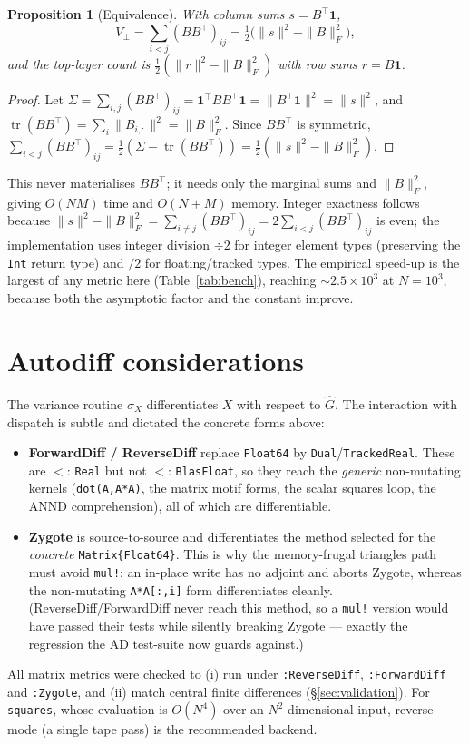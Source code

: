 \documentclass[11pt]{article}
\theoremstyle{plain}
\newtheorem{proposition}{Proposition}
\theoremstyle{definition}
\newcommand{\tr}{\operatorname{tr}}
\newcommand{\Ghat}{\hat{G}}
\begin{document}
\begin{proposition}[Equivalence]\label{prop:vmot}
With column sums $s=B^\top\mathbf 1$,
\[
V_\perp=\sum_{i<j}(BB^\top)_{ij}=\tfrac12\big(\|s\|^2-\|B\|_F^2\big),
\]
and the top-layer count is $\tfrac12(\|r\|^2-\|B\|_F^2)$ with row sums $r=B\mathbf 1$.
\end{proposition}
\begin{proof}
Let $\Sigma=\sum_{i,j}(BB^\top)_{ij}=\mathbf 1^\top BB^\top\mathbf 1=\|B^\top\mathbf 1\|^2=\|s\|^2$, and
$\tr(BB^\top)=\sum_i\|B_{i,:}\|^2=\|B\|_F^2$. Since $BB^\top$ is symmetric,
$\sum_{i<j}(BB^\top)_{ij}=\tfrac12(\Sigma-\tr(BB^\top))=\tfrac12(\|s\|^2-\|B\|_F^2)$.
\end{proof}

This never materialises $BB^\top$; it needs only the marginal sums and $\|B\|_F^2$, giving $O(NM)$ time and
$O(N+M)$ memory. Integer exactness follows because
$\|s\|^2-\|B\|_F^2=\sum_{i\neq j}(BB^\top)_{ij}=2\sum_{i<j}(BB^\top)_{ij}$ is even; the implementation uses
integer division $\div 2$ for integer element types (preserving the \texttt{Int} return type) and $/2$ for
floating/tracked types. The empirical speed-up is the largest of any metric here (Table~\ref{tab:bench}),
reaching $\sim$$2.5\times10^3$ at $N=10^3$, because both the asymptotic factor and the constant improve.

\section{Autodiff considerations}
\label{sec:ad}

The variance routine $\sigma_X$ differentiates $X$ with respect to $\Ghat$. The interaction with dispatch is
subtle and dictated the concrete forms above:
\begin{itemize}
  \item \textbf{ForwardDiff / ReverseDiff} replace \texttt{Float64} by \texttt{Dual}/\texttt{TrackedReal}.
  These are $<:$\,\texttt{Real} but not $<:$\,\texttt{BlasFloat}, so they reach the \emph{generic}
  non-mutating kernels (\texttt{dot(A,A*A)}, the matrix motif forms, the scalar squares loop, the ANND
  comprehension), all of which are differentiable.
  \item \textbf{Zygote} is source-to-source and differentiates the method selected for the \emph{concrete}
  \texttt{Matrix\{Float64\}}. This is why the memory-frugal triangles path must avoid \texttt{mul!}: an
  in-place write has no adjoint and aborts Zygote, whereas the non-mutating \texttt{A*A[:,i]} form
  differentiates cleanly. (ReverseDiff/ForwardDiff never reach this method, so a \texttt{mul!} version would
  have passed their tests while silently breaking Zygote --- exactly the regression the AD test-suite now
  guards against.)
\end{itemize}
All matrix metrics were checked to (i) run under \texttt{:ReverseDiff}, \texttt{:ForwardDiff} and
\texttt{:Zygote}, and (ii) match central finite differences (\S\ref{sec:validation}). For \texttt{squares},
whose evaluation is $O(N^4)$ over an $N^2$-dimensional input, reverse mode (a single tape pass) is the
recommended backend.
\end{document}
